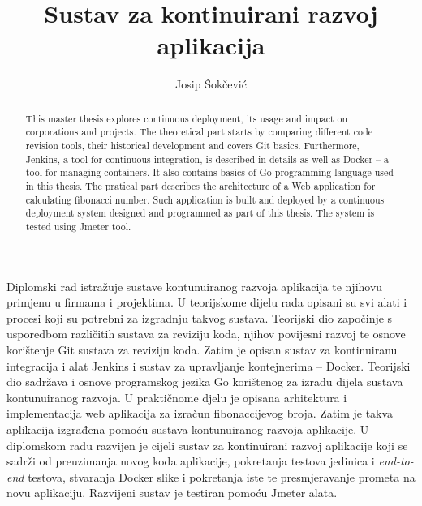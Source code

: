 \documentclass[times, utf8, numeric, diplomski]{ferit}
\begin{document}
\sloppy
\title{Sustav za kontinuirani razvoj aplikacija}

\author{Josip Šokčević}
\maketitle

\tableofcontents














\begin{sazetak}
    Diplomski rad istražuje sustave kontunuiranog razvoja aplikacija te njihovu primjenu u firmama i
    projektima. U teorijskome dijelu rada opisani su svi alati i procesi koji su potrebni za
    izgradnju takvog sustava. Teorijski dio započinje s usporedbom različitih sustava za reviziju
    koda, njihov povijesni razvoj te osnove korištenje Git sustava za reviziju koda. Zatim je opisan
    sustav za kontinuiranu integracija i alat Jenkins i sustav za upravljanje kontejnerima --
    Docker. Teorijski dio sadržava i osnove programskog jezika Go korištenog za izradu dijela
    sustava kontunuiranog razvoja. U praktičnome djelu je opisana arhitektura i implementacija web
    aplikacija za izračun fibonaccijevog broja. Zatim je takva aplikacija izgrađena pomoću sustava
    kontunuiranog razvoja aplikacije. U diplomskom radu razvijen je cijeli sustav za kontinuirani
    razvoj aplikacije koji se sadrži od preuzimanja novog koda aplikacije, pokretanja testova
    jedinica i \textit{end-to-end} testova, stvaranja Docker slike i pokretanja iste te
    presmjeravanje prometa na novu aplikaciju. Razvijeni sustav je testiran pomoću Jmeter alata.

\end{sazetak}

\begin{abstract}
    This master thesis explores continuous deployment, its usage and impact on corporations and
    projects. The theoretical part starts by comparing different code revision tools, their
    historical development and covers Git basics. Furthermore, Jenkins, a tool for continuous
    integration, is described in details as well as Docker -- a tool for managing containers. It
    also contains basics of Go programming language used in this thesis. The pratical part describes
    the architecture of a Web application for calculating fibonacci number. Such application is
    built and deployed by a continuous deployment system designed and programmed as
    part of this thesis. The system is tested using Jmeter tool.

\end{abstract}


\end{document}
